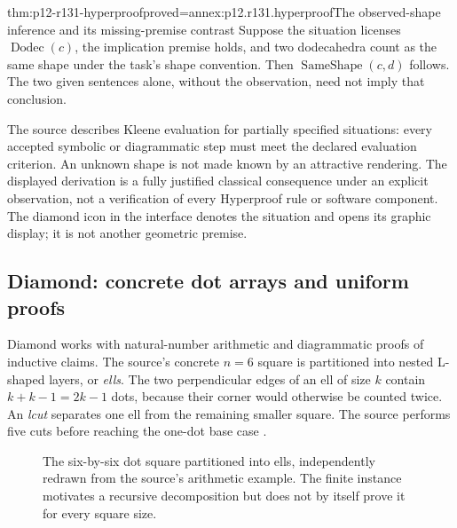 \begin{hbtheorem}{thm:p12-r131-hyperproof}{proved=annex:p12.r131.hyperproof}{The observed-shape inference and its missing-premise contrast}
Suppose the situation licenses \(\operatorname{Dodec}(c)\), the
implication premise holds, and two dodecahedra count as the same shape
under the task's shape convention. Then
\(\operatorname{SameShape}(c,d)\) follows. The two given sentences
alone, without the observation, need not imply that conclusion.
\end{hbtheorem}

The source describes Kleene evaluation for partially specified situations:
every accepted symbolic or diagrammatic step must meet the declared
evaluation criterion. An unknown shape is not made known by an attractive
rendering. The displayed derivation is a fully justified classical
consequence under an explicit observation, not a verification of every
Hyperproof rule or software component. The diamond icon in the interface
denotes the situation and opens its graphic display; it is not another
geometric premise.

\subsection{Diamond: concrete dot arrays and uniform proofs}

Diamond works with natural-number arithmetic and diagrammatic proofs of
inductive claims. The source's concrete \(n=6\) square is partitioned
into nested L-shaped layers, or \emph{ells}. The two perpendicular
edges of an ell of size \(k\) contain \(k+k-1=2k-1\) dots,
because their corner would otherwise be counted twice. An \emph{lcut}
separates one ell from the remaining smaller square. The source performs
five cuts before reaching the one-dot base case
\cite[pp.~719--720, note~8]{Jamnik2021LogicalDiagrams}.

\begin{figure}[htbp]
\centering
{}
\caption{The six-by-six dot square partitioned into ells, independently
redrawn from the source's arithmetic example. The finite instance
motivates a recursive decomposition but does not by itself prove it
for every square size.}
\label{fig:p12-r131-ells}
\end{figure}


